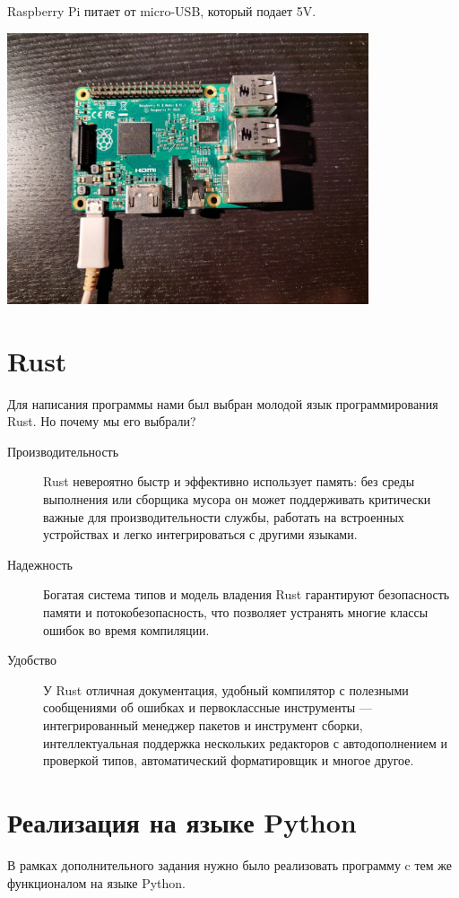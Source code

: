 \documentclass[a4paper,12pt]{article}
\begin{document}
Raspberry Pi питает от micro-USB, который подает 5V.
\begin{center}
  \includegraphics[width=0.8\textwidth]{raspberry.pdf}
\end{center}

\newpage
\section{Rust}
Для написания программы нами был выбран молодой язык программирования Rust. Но почему мы его выбрали?
\begin{description}
  \item[Производительность] Rust невероятно быстр и эффективно использует память:
  без среды выполнения или сборщика мусора он может поддерживать критически важные для
  производительности службы, работать на встроенных устройствах и легко интегрироваться с другими языками.
  \item[Надежность] Богатая система типов и модель владения Rust гарантируют безопасность памяти и потокобезопасность,
  что позволяет устранять многие классы ошибок во время компиляции.
  \item[Удобство] У Rust отличная документация, удобный компилятор с полезными сообщениями об ошибках и первоклассные инструменты
  — интегрированный менеджер пакетов и инструмент сборки, интеллектуальная поддержка нескольких редакторов с автодополнением
   и проверкой типов, автоматический форматировщик и многое другое.
\end{description}

\newpage

\section{Реализация на языке Python}
В рамках дополнительного задания нужно было реализовать программу c тем же функционалом на языке Python.
\newpage
\end{document}
